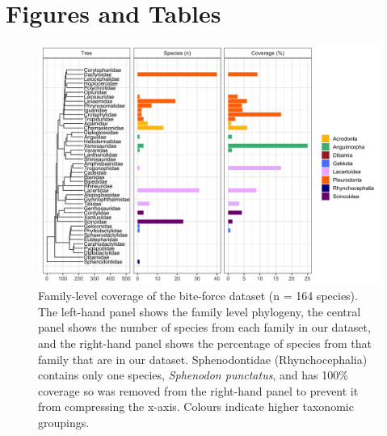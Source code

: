 \documentclass[a4paper, 12pt]{article}
\begin{document}
\newpage
\section{Figures and Tables}


\begin{figure}[h]
 \centering
  \includegraphics[width = \linewidth]{figures/phylogeny-data-coverage.png}
  \caption{Family-level coverage of the bite-force dataset (n = 164 species). 
  The left-hand panel shows the family level phylogeny, the central panel shows the number of species from each family in our dataset, and the right-hand panel shows the percentage of species from that family \citep[from][]{uetz2020reptile} that are in our dataset. 
  Sphenodontidae (Rhynchocephalia) contains only one species, \textit{Sphenodon punctatus}, and has 100\% coverage so was removed from the right-hand panel to prevent it from compressing the x-axis. 
  Colours indicate higher taxonomic groupings.
}
  \label{fig-data-coverage}
\end{figure}
\end{document}
